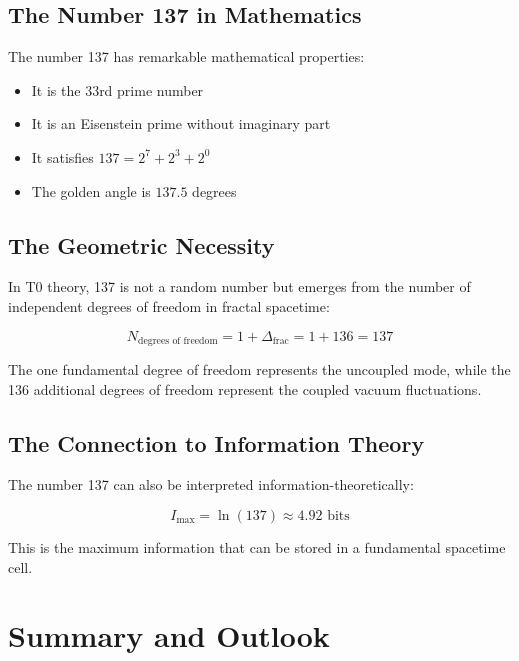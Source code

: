 \documentclass[12pt,a4paper]{article}
\theoremstyle{definition}
\begin{document}
	\subsection{The Number 137 in Mathematics}
	
	The number 137 has remarkable mathematical properties:
	
	\begin{itemize}
		\item It is the 33rd prime number
		\item It is an Eisenstein prime without imaginary part
		\item It satisfies $137 = 2^7 + 2^3 + 2^0$
		\item The golden angle is $137.5$ degrees
	\end{itemize}
	
	\subsection{The Geometric Necessity}
	
	In T0 theory, 137 is not a random number but emerges from the number of independent degrees of freedom in fractal spacetime:
	
	\begin{equation}
		N_{\text{degrees of freedom}} = 1 + \Delta_{\text{frac}} = 1 + 136 = 137
	\end{equation}
	
	The one fundamental degree of freedom represents the uncoupled mode, while the 136 additional degrees of freedom represent the coupled vacuum fluctuations.
	
	\subsection{The Connection to Information Theory}
	
	The number 137 can also be interpreted information-theoretically:
	
	\begin{equation}
		I_{\text{max}} = \ln(137) \approx 4.92 \text{ bits}
	\end{equation}
	
	This is the maximum information that can be stored in a fundamental spacetime cell.
	
	\section{Summary and Outlook}
	
\end{document}
